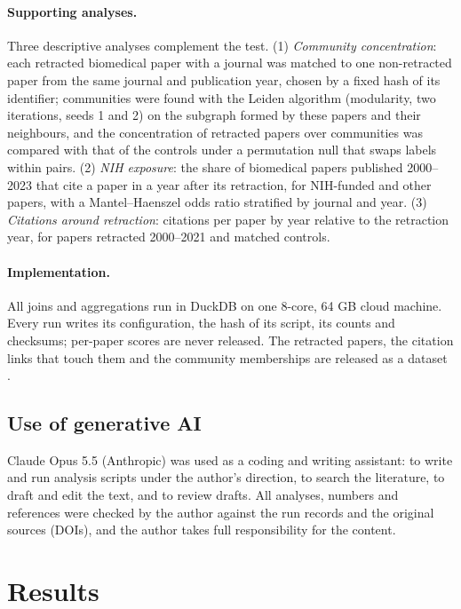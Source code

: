 \documentclass[pdflatex,sn-basic]{sn-jnl}
\begin{document}
\paragraph{Supporting analyses.} Three descriptive analyses complement the test. (1) \emph{Community concentration}:
each retracted biomedical paper with a journal was matched to one non-retracted paper from the same journal and
publication year, chosen by a fixed hash of its identifier; communities were found with the Leiden algorithm \citep{traag2019leiden} (modularity, two iterations, seeds 1
and 2) on the subgraph formed by
these papers and their neighbours, and the concentration of retracted papers over communities was compared with that
of the controls under a permutation null that swaps labels within pairs. (2) \emph{NIH exposure}: the share of
biomedical papers published 2000--2023 that cite a paper in a year after its retraction, for NIH-funded and other
papers, with a Mantel--Haenszel odds ratio stratified by journal and year. (3) \emph{Citations around retraction}:
citations per paper by year relative to the retraction year, for papers retracted 2000--2021 and matched controls.

\paragraph{Implementation.} All joins and aggregations run in DuckDB \citep{raasveldt2019duckdb} on one 8-core, 64 GB
cloud machine. Every run writes its configuration, the hash of its script, its counts and checksums; per-paper scores
are never released. The retracted papers, the citation links that touch them and the community memberships are
released as a dataset \citep{arjomandi2026retracteddata}.
\subsection{Use of generative AI}\label{sec:ai-use}
Claude Opus 5.5 (Anthropic) was used as a coding and writing assistant: to write and run analysis scripts under the
author's direction, to search the literature, to draft and edit the text, and to review drafts. All analyses, numbers
and references were checked by the author against the run records and the original sources (DOIs), and the author
takes full responsibility for the content.
\section{Results}\label{sec:results}
\end{document}
